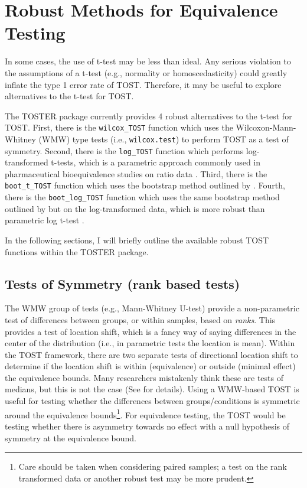\documentclass[]{interact}
\theoremstyle{plain}%
\theoremstyle{definition}
\theoremstyle{remark}
\begin{document}
\newpage

\hypertarget{robust-methods-for-equivalence-testing}{%
\section{Robust Methods for Equivalence
Testing}\label{robust-methods-for-equivalence-testing}}

In some cases, the use of t-test may be less than ideal. Any serious
violation to the assumptions of a t-test (e.g., normality or
homoscedasticity) could greatly inflate the type 1 error rate of TOST.
Therefore, it may be useful to explore alternatives to the t-test for
TOST.

The TOSTER package currently provides 4 robust alternatives to the
t-test for TOST. First, there is the \texttt{wilcox\_TOST} function
which uses the Wilcoxon-Mann-Whitney (WMW) type tests (i.e.,
\texttt{wilcox.test}) to perform TOST as a test of symmetry. Second,
there is the \texttt{log\_TOST} function which performs log-transformed
t-tests, which is a parametric approach commonly used in pharmaceutical
bioequivalence studies on ratio data \citep{he2022}. Third, there is the
\texttt{boot\_t\_TOST} function which uses the bootstrap method outlined
by \citet{efron93}. Fourth, there is the \texttt{boot\_log\_TOST}
function which uses the same bootstrap method outlined by
\citet{efron93} but on the log-transformed data, which is more robust
than parametric log t-test \citep{he2022}.

In the following sections, I will briefly outline the available robust
TOST functions within the TOSTER package.

\hypertarget{tests-of-symmetry-rank-based-tests}{%
\subsection{Tests of Symmetry (rank based
tests)}\label{tests-of-symmetry-rank-based-tests}}

The WMW group of tests (e.g., Mann-Whitney U-test) provide a
non-parametric test of differences between groups, or within samples,
based on \emph{ranks}. This provides a test of location shift, which is
a fancy way of saying differences in the center of the distribution
(i.e., in parametric tests the location is mean). Within the TOST
framework, there are two separate tests of directional location shift to
determine if the location shift is within (equivalence) or outside
(minimal effect) the equivalence bounds. Many researchers mistakenly
think these are tests of medians, but this is not the case (See
\citet{median_test} for details). Using a WMW-based TOST is useful for
testing whether the differences between groups/conditions is symmetric
around the equivalence bounds\footnote{Care should be taken when
  considering paired samples; a test on the rank transformed data
  \citep{kornbrot1990rank} or another robust test may be more prudent.}.
For equivalence testing, the TOST would be testing whether there is
asymmetry towards no effect with a null hypothesis of symmetry at the
equivalence bound.
\end{document}
